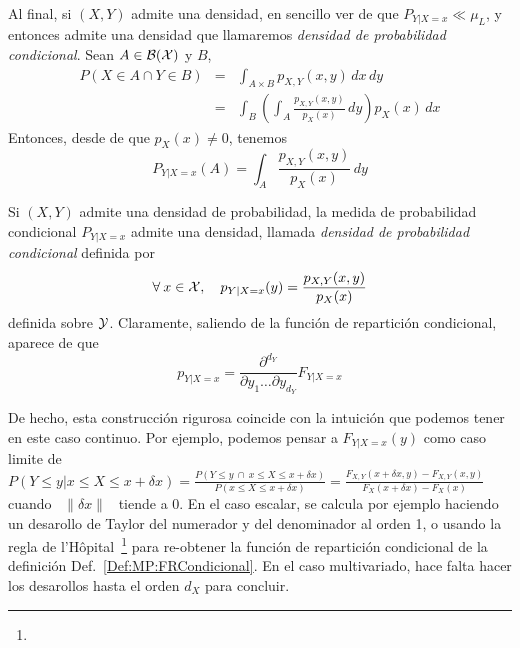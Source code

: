 {Al final, si $(X,Y)$ admite una  densidad, en sencillo ver de que $P_{Y|X=x} \ll
\mu_L$,  y  entonces  admite  una  densidad  que  llamaremos  {\it  densidad  de
  probabilidad condicional}. Sean $A \in \mathcal{B}(\mathcal{X})$ y $B$,
%
\begin{eqnarray*}
P(X \in A \cap Y \in B) & = & \int_{A \times B} p_{X,Y}(x,y) \, dx \, dy\\[2mm]
%
& = & \int_B \left( \int_A \frac{p_{X,Y}(x,y)}{p_X(x)} \, dy \right) p_X(x) \, dx
\end{eqnarray*}
%
Entonces, desde de que $p_X(x) \ne 0$, tenemos
%
\[
P_{Y|X=x}(A) = \int_A \frac{p_{X,Y}(x,y)}{p_X(x)} \, dy
\]
%
\begin{teorema}
  Si  $(X,Y)$ admite  una densidad  de probabilidad,  la medida  de probabilidad
  condicional  $P_{Y|X=x}$  admite  una   densidad,  llamada  {\it  densidad  de
    probabilidad condicional} definida por
  \[
  \forall \: x \in \mathcal{X}, \quad p_{Y|X=x}(y) = \frac{p_{X,Y}(x,y)}{p_X(x)}
  \]
  definida  sobre $\mathcal{Y}$. Claramente,  saliendo de  la funci\'on  de repartici\'on
  condicional, aparece de que
  \[
  p_{Y|X=x} = \frac{\partial^{d_Y}}{\partial y_1 \ldots \partial y_{d_Y}} F_{Y|X=x}
  \]
\end{teorema}

De hecho, esta  construcci\'on rigurosa coincide con la  intuici\'on que podemos
tener en este  caso continuo. Por ejemplo, podemos  pensar a $F_{Y|X=x}(y)$ como
caso limite de  $P(\left. Y \le y \right|  x \le X \le x+\delta x)  = \frac{P( Y
  \le  y \:  \cap \:  x \le  X \le  x+\delta x)}{P(x  \le X  \le x+\delta  x)} =
\frac{F_{X,Y}(x+\delta  x ,  y) -  F_{X,Y}(x  , y)}{F_X(x+\delta  x) -  F_X(x)}$
cuando \  $\| \delta  x\|$ \ tiende  a 0.   En el caso  escalar, se  calcula por
ejemplo haciendo un desarollo de Taylor del numerador y del denominador al orden
1, o  usando la  regla de l'H\^opital~\footnote{}  para re-obtener la
funci\'on     de     repartici\'on     condicional    de     la     definici\'on
Def.~\ref{Def:MP:FRCondicional}. En  el caso multivariado, hace  falta hacer los
desarollos hasta el orden $d_X$ para concluir.

}
